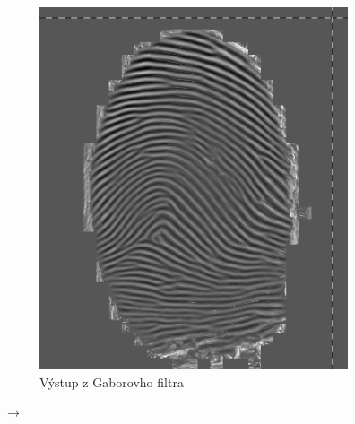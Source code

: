 \documentclass[11pt,a4paper]{article}
\begin{document}
\begin{figure}[h!]
	\centering
	\begin{subfigure}{0.45\textwidth}
		\centering
		\includegraphics[width=.95\linewidth]{images/Screenshot_12}
		\caption{Výstup z Gaborovho filtra}
	\end{subfigure}%
	{\LARGE$\xrightarrow{}$}
	\begin{subfigure}{0.40\textwidth}
		\centering

\end{subfigure}
\end{figure}
\end{document}
